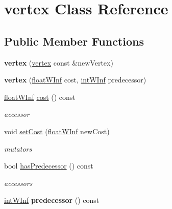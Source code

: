 \hypertarget{classvertex}{
\section{vertex Class Reference}
\label{classvertex}
}
\subsection*{Public Member Functions}
\begin{DoxyCompactItemize}
\item 
\hypertarget{classvertex_af7a2a6c642b82023fe602a2f80995891}{
{\bfseries vertex} (\hyperlink{classvertex}{vertex} const \&newVertex)}
\label{classvertex_af7a2a6c642b82023fe602a2f80995891}

\item 
\hypertarget{classvertex_a2e49fb5e9342177fa8a4c6cedb1e3faf}{
{\bfseries vertex} (\hyperlink{classfloatWInf}{floatWInf} cost, \hyperlink{classintWInf}{intWInf} predecessor)}
\label{classvertex_a2e49fb5e9342177fa8a4c6cedb1e3faf}

\item 
\hypertarget{classvertex_a5aa6a8aaca7c346de5b97c57762a061f}{
\hyperlink{classfloatWInf}{floatWInf} \hyperlink{classvertex_a5aa6a8aaca7c346de5b97c57762a061f}{cost} () const }
\label{classvertex_a5aa6a8aaca7c346de5b97c57762a061f}

\begin{DoxyCompactList}\small\item\em accessor \end{DoxyCompactList}\item 
\hypertarget{classvertex_a523612e1ec34311c0d614349606b4321}{
void \hyperlink{classvertex_a523612e1ec34311c0d614349606b4321}{setCost} (\hyperlink{classfloatWInf}{floatWInf} newCost)}
\label{classvertex_a523612e1ec34311c0d614349606b4321}

\begin{DoxyCompactList}\small\item\em mutators \end{DoxyCompactList}\item 
\hypertarget{classvertex_af92445dfc496a7defc536302bf96f923}{
bool \hyperlink{classvertex_af92445dfc496a7defc536302bf96f923}{hasPredecessor} () const }
\label{classvertex_af92445dfc496a7defc536302bf96f923}

\begin{DoxyCompactList}\small\item\em accessors \end{DoxyCompactList}\item 
\hypertarget{classvertex_a3d2bcfdb9bee51a5f0ecd85334fbee19}{
\hyperlink{classintWInf}{intWInf} {\bfseries predecessor} () const }
\label{classvertex_a3d2bcfdb9bee51a5f0ecd85334fbee19}


\end{DoxyCompactItemize}
